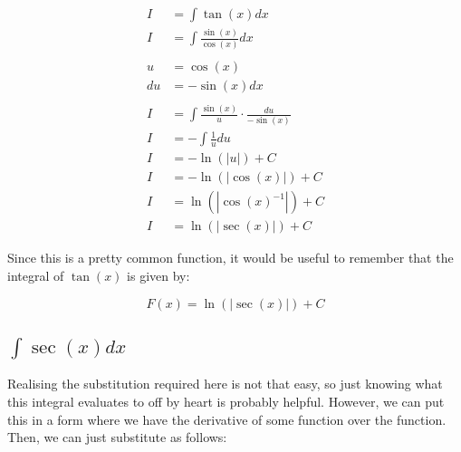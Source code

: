 \documentclass[12pt]{article}
\begin{document}
\begin{align}
    I  & = \int \tan(x) dx                                  \\
    I  & = \int \frac{\sin(x)}{\cos(x)} dx                  \\
    \nonumber                                               \\
    u  & = \cos(x)                                          \\
    du & = -\sin(x) dx                                      \\
    \nonumber                                               \\
    I  & = \int \frac{\sin(x)}{u} \cdot \frac{du}{-\sin(x)} \\
    I  & = -\int \frac{1}{u} du                             \\
    I  & = -\ln(|u|) + C                                    \\
    I  & = -\ln(|\cos(x)|) + C                              \\
    I  & = \ln(|\cos(x)^{-1}|) + C                          \\
    I  & = \ln(|\sec(x)|) + C
\end{align}


Since this is a pretty common function, it would be useful to remember that the integral of $\tan(x)$ is given by:

$$
    F(x) = \ln(|\sec(x)|) + C
$$

\subsection{$\int \sec(x) dx$}

Realising the substitution required here is not that easy, so just knowing what this integral evaluates to off by heart is probably helpful. However, we can put this in a form where we have the derivative of some function over the function. Then, we can just substitute as follows:
\end{document}
